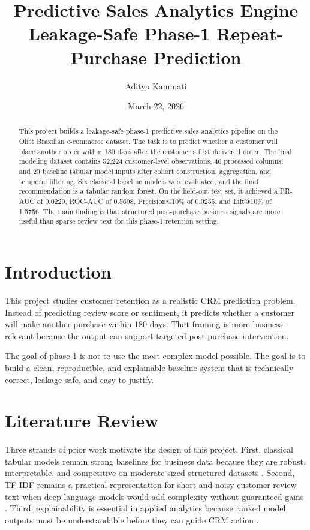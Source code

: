 \documentclass[11pt,a4paper]{article}
\title{Predictive Sales Analytics Engine\\\large Leakage-Safe Phase-1 Repeat-Purchase Prediction}
\author{Aditya Kammati}
\date{March 22, 2026}
\begin{document}
\maketitle

\begin{abstract}
This project builds a leakage-safe phase-1 predictive sales analytics pipeline on the Olist Brazilian e-commerce dataset. The task is to predict whether a customer will place another order within 180 days after the customer's first delivered order. The final modeling dataset contains 52{,}224 customer-level observations, 46 processed columns, and 20 baseline tabular model inputs after cohort construction, aggregation, and temporal filtering. Six classical baseline models were evaluated, and the final recommendation is a tabular random forest. On the held-out test set, it achieved a PR-AUC of 0.0229, ROC-AUC of 0.5698, Precision@10\% of 0.0255, and Lift@10\% of 1.5756. The main finding is that structured post-purchase business signals are more useful than sparse review text for this phase-1 retention setting.
\end{abstract}

\section{Introduction}
This project studies customer retention as a realistic CRM prediction problem. Instead of predicting review score or sentiment, it predicts whether a customer will make another purchase within 180 days. That framing is more business-relevant because the output can support targeted post-purchase intervention.

The goal of phase 1 is not to use the most complex model possible. The goal is to build a clean, reproducible, and explainable baseline system that is technically correct, leakage-safe, and easy to justify.

\section{Literature Review}
Three strands of prior work motivate the design of this project. First, classical tabular models remain strong baselines for business data because they are robust, interpretable, and competitive on moderate-sized structured datasets \cite{breiman2001}. Second, TF-IDF remains a practical representation for short and noisy customer review text when deep language models would add complexity without guaranteed gains \cite{salton1988}. Third, explainability is essential in applied analytics because ranked model outputs must be understandable before they can guide CRM action \cite{molnar2022}.
\end{document}
